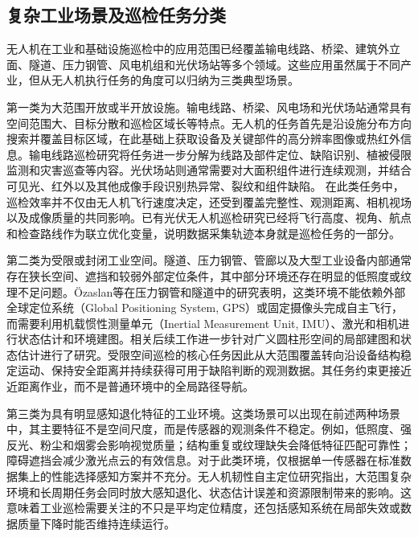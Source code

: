 \subsection{复杂工业场景及巡检任务分类}

无人机在工业和基础设施巡检中的应用范围已经覆盖输电线路、桥梁、建筑外立面、隧道、压力钢管、风电机组和光伏场站等多个领域\cite{Nguyen2018PowerLine,Jeong2020BridgeReview,Falorca2020Facade,Ozaslan2017Penstocks}。这些应用虽然属于不同产业，但从无人机执行任务的角度可以归纳为三类典型场景。

第一类为大范围开放或半开放设施。输电线路、桥梁、风电场和光伏场站通常具有空间范围大、目标分散和巡检区域长等特点。无人机的任务首先是沿设施分布方向搜索并覆盖目标区域，在此基础上获取设备及关键部件的高分辨率图像或热红外信息。输电线路巡检研究将任务进一步分解为线路及部件定位、缺陷识别、植被侵限监测和灾害巡查等内容\cite{Nguyen2018PowerLine,Ahmed2024Transmission}。光伏场站则通常需要对大面积组件进行连续观测，并结合可见光、红外以及其他成像手段识别热异常、裂纹和组件缺陷\cite{Yahya2022PVReview,Ramirez2022PVRTK,oliveira2023pvairt,zefri2023pvlwir}。 在此类任务中，巡检效率并不仅由无人机飞行速度决定，还受到覆盖完整性、观测距离、相机视场以及成像质量的共同影响。已有光伏无人机巡检研究已经将飞行高度、视角、航点和检查路线作为联立优化变量，说明数据采集轨迹本身就是巡检任务的一部分\cite{Vergara2022PVAerial}。

第二类为受限或封闭工业空间。隧道、压力钢管、管廊以及大型工业设备内部通常存在狭长空间、遮挡和较弱外部定位条件，其中部分环境还存在明显的低照度或纹理不足问题。Özaslan等在压力钢管和隧道中的研究表明，这类环境不能依赖外部全球定位系统（Global Positioning System, GPS）或固定摄像头完成自主飞行，而需要利用机载惯性测量单元（Inertial Measurement Unit, IMU）、激光和相机进行状态估计和环境建图\cite{Ozaslan2017Penstocks,yu2021rcar,alsayed2021rs}。相关后续工作进一步针对广义圆柱形空间的局部建图和状态估计进行了研究\cite{Ozaslan2018Cylinders}。受限空间巡检的核心任务因此从大范围覆盖转向沿设备结构稳定运动、保持安全距离并持续获得可用于缺陷判断的观测数据。其任务约束更接近近距离作业，而不是普通环境中的全局路径导航。

第三类为具有明显感知退化特征的工业环境。这类场景可以出现在前述两种场景中，其主要特征不是空间尺度，而是传感器的观测条件不稳定。例如，低照度、强反光、粉尘和烟雾会影响视觉质量；结构重复或纹理缺失会降低特征匹配可靠性；障碍遮挡会减少激光点云的有效信息。对于此类环境，仅根据单一传感器在标准数据集上的性能选择感知方案并不充分。无人机韧性自主定位研究指出，大范围复杂环境和长周期任务会同时放大感知退化、状态估计误差和资源限制带来的影响\cite{Zhao2024ResilientUAV}。这意味着工业巡检需要关注的不只是平均定位精度，还包括感知系统在局部失效或数据质量下降时能否维持连续运行\cite{Zhao2024ResilientUAV,boiteau2024uavlowvisibility}。

